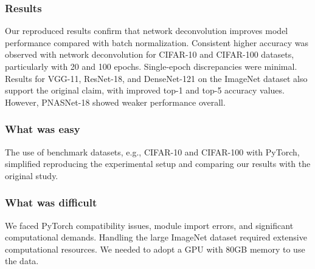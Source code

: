 \subsubsection*{Results}


Our reproduced results confirm that network deconvolution improves model performance compared with batch normalization. Consistent higher accuracy was observed with network deconvolution for CIFAR-10 and CIFAR-100 datasets, particularly with 20 and 100 epochs. Single-epoch discrepancies were minimal. Results for VGG-11, ResNet-18, and DenseNet-121 on the ImageNet dataset also support the original claim, with improved top-1 and top-5 accuracy values. However, PNASNet-18 showed weaker performance overall.

\subsubsection*{What was easy}

The use of benchmark datasets, e.g., CIFAR-10 and CIFAR-100 with PyTorch, simplified reproducing the experimental setup and comparing our results with the original study.

\subsubsection*{What was difficult}


We faced PyTorch compatibility issues, module import errors, and significant computational demands. Handling the large ImageNet dataset required extensive computational resources. We needed to adopt a GPU with 80GB memory to use the data.


